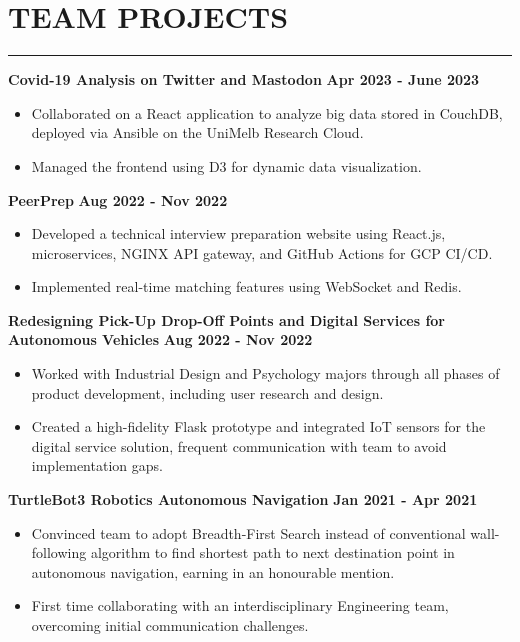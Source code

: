 \documentclass{article}
\begin{document}
\section*{TEAM PROJECTS}
\vspace{-12pt}
\rule{\textwidth}{3pt}
\textbf{Covid-19 Analysis on Twitter and Mastodon}
\hfill \textbf{Apr 2023 - June 2023}
\begin{itemize}
    \item Collaborated on a React application to analyze big data stored in CouchDB,
    deployed via Ansible on the UniMelb Research Cloud.
    \item Managed the frontend using D3 for dynamic data visualization.
\end{itemize}

\noindent \textbf{PeerPrep}
\hfill \textbf{Aug 2022 - Nov 2022}
\begin{itemize}
    \item Developed a technical interview preparation website using React.js, microservices,
    NGINX API gateway, and GitHub Actions for GCP CI/CD.
    \item Implemented real-time matching features using WebSocket and Redis.
\end{itemize}

\noindent \textbf{Redesigning Pick-Up Drop-Off Points and Digital Services for Autonomous Vehicles}
\hfill \textbf{Aug 2022 - Nov 2022}
\begin{itemize}
    \item Worked with Industrial Design and Psychology majors through
    all phases of product development, including user research and design.
    \item Created a high-fidelity Flask prototype and integrated IoT sensors for the
    digital service solution, frequent communication with team to avoid implementation gaps.
\end{itemize}

\noindent \textbf{TurtleBot3 Robotics Autonomous Navigation}
\hfill \textbf{Jan 2021 - Apr 2021}
\begin{itemize}
    \item Convinced team to adopt Breadth-First Search instead of conventional
    wall-following algorithm to find shortest path to next destination point
    in autonomous navigation, earning in an honourable mention.
    \item First time collaborating with an interdisciplinary Engineering team,
    overcoming initial communication challenges.
\end{itemize}
\end{document}
